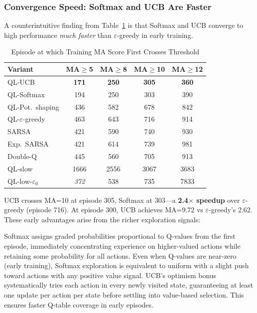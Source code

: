 \documentclass[10pt,conference]{IEEEtran}
\begin{document}
\subsubsection{Convergence Speed: Softmax and UCB Are Faster}

A counterintuitive finding from Table~\ref{tab:conv} is that
Softmax and UCB converge to high performance \emph{much faster}
than $\varepsilon$-greedy in early training.

\begin{table}[h]
  \centering
  \caption{Episode at which Training MA Score First Crosses Threshold}
  \label{tab:conv}
  \begin{tabular}{lcccc}
    \toprule
    Variant & MA$\geq$5 & MA$\geq$8 & MA$\geq$10 & MA$\geq$12 \\
    \midrule
    QL-UCB      & \textbf{171} & \textbf{250} & \textbf{305} & \textbf{360} \\
    QL-Softmax  & 194 & 250 & 303 & 390 \\
    QL-Pot.\ shaping & 436 & 582 & 678 & 842 \\
    QL-$\varepsilon$-greedy & 463 & 643 & 716 & 914 \\
    SARSA       & 421 & 590 & 740 & 930 \\
    Exp.\ SARSA & 421 & 614 & 739 & 981 \\
    Double-Q    & 445 & 560 & 705 & 913 \\
    QL-slow     & 1666 & 2556 & 3067 & 3683 \\
    QL-low-$\varepsilon_0$ & \textit{372} & 538 & 735 & 7833 \\
    \bottomrule
  \end{tabular}
\end{table}

UCB crosses MA=10 at episode 305, Softmax at 303---a
\textbf{2.4$\times$ speedup} over $\varepsilon$-greedy (episode 716).
At episode 300, UCB achieves MA=9.72 vs $\varepsilon$-greedy's 2.62.
These early advantages arise from the richer exploration signals:

Softmax assigns graded probabilities proportional to Q-values from
the first episode, immediately concentrating experience on
higher-valued actions while retaining some probability for all
actions.
Even when Q-values are near-zero (early training), Softmax exploration
is equivalent to uniform with a slight push toward actions with any
positive value signal.
UCB's optimism bonus systematically tries each action in every
newly visited state, guaranteeing at least one update per
action per state before settling into value-based selection.
This ensures faster Q-table coverage in early episodes.
\end{document}
